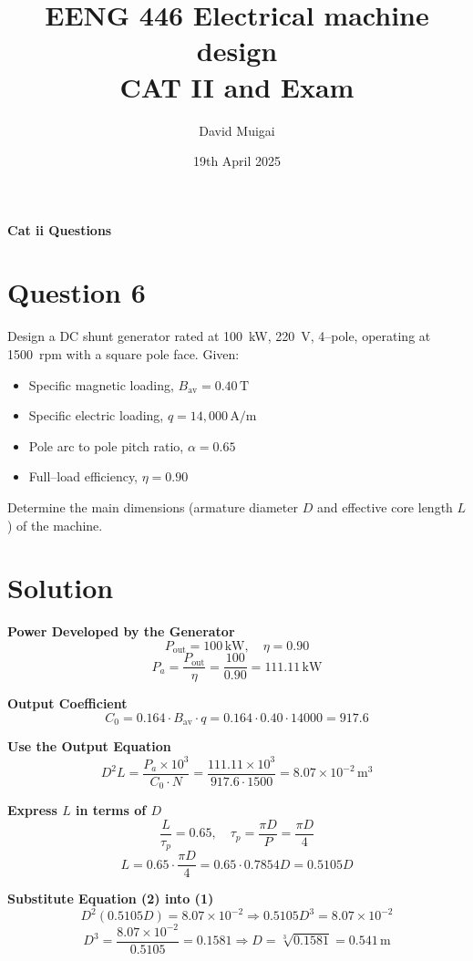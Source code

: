\documentclass[12pt]{article}
\title{\textbf{EENG 446 Electrical machine design}\\ CAT II and Exam}
\date{19th April 2025}
\author{David Muigai}
\begin{document}
\maketitle

\begin{center}
	\textbf{\LARGE Cat ii Questions}
\end{center}

\bigskip

\section*{Question 6}

\noindent
 Design a DC shunt generator rated at 100~kW, 220~V, 4--pole, operating at 1500~rpm with a square pole face. Given:

\begin{itemize}
	\item Specific magnetic loading, \( B_{\text{av}} = 0.40 \,\text{T} \)
	\item Specific electric loading, \( q = 14{,}000 \,\text{A/m} \)
	\item Pole arc to pole pitch ratio, \( \alpha = 0.65 \)
	\item Full–load efficiency, \( \eta = 0.90 \)
\end{itemize}
Determine the main dimensions (armature diameter \( D \) and effective core length \( L \)) of the machine.

\section*{Solution}

\textbf{ Power Developed by the Generator}
\[
P_{\text{out}} = 100\, \text{kW}, \quad \eta = 0.90
\]
\[
P_a = \frac{P_{\text{out}}}{\eta} = \frac{100}{0.90} = 111.11\, \text{kW}
\]

\textbf{ Output Coefficient}
\[
C_0 = 0.164 \cdot B_{\text{av}} \cdot q = 0.164 \cdot 0.40 \cdot 14000 = 917.6
\]

\textbf{Use the Output Equation}
\[
D^2 L = \frac{P_a \times 10^3}{C_0 \cdot N} = \frac{111.11 \times 10^3}{917.6 \cdot 1500} = 8.07 \times 10^{-2} \, \text{m}^3 \tag{1}
\]

\textbf{Express \( L \) in terms of \( D \)}
\[
\frac{L}{\tau_p} = 0.65, \quad \tau_p = \frac{\pi D}{P} = \frac{\pi D}{4}
\]
\[
L = 0.65 \cdot \frac{\pi D}{4} = 0.65 \cdot 0.7854 D = 0.5105 D \tag{2}
\]

\textbf{Substitute Equation (2) into (1)}
\[
D^2 (0.5105 D) = 8.07 \times 10^{-2}
\Rightarrow 0.5105 D^3 = 8.07 \times 10^{-2}
\]
\[
D^3 = \frac{8.07 \times 10^{-2}}{0.5105} = 0.1581 \Rightarrow D = \sqrt[3]{0.1581} = 0.541\, \text{m}
\]
\end{document}
